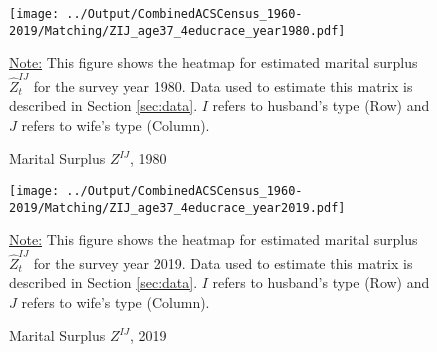 \begin{figure}[H] \caption{Marital Surplus $Z^{IJ}$, 1980} \label{appfig:Z1980}
    \texttt{[image: ../Output/CombinedACSCensus\_1960-2019/Matching/ZIJ\_age37\_4educrace\_year1980.pdf]}  
    \begin{fignote} 
\underline{Note:} This figure shows the heatmap for estimated marital surplus $\hat{Z}^{IJ}_t$ for the survey year 1980. Data used to estimate this matrix is described in Section \ref{sec:data}. $I$ refers to husband's type (Row) and $J$ refers to wife's type (Column). 
\end{fignote}  
\end{figure}



\begin{figure}[H] \caption{Marital Surplus $Z^{IJ}$, 2019}  \label{appfig:Z2019}
    \texttt{[image: ../Output/CombinedACSCensus\_1960-2019/Matching/ZIJ\_age37\_4educrace\_year2019.pdf]}    
      \begin{fignote} 
\underline{Note:} This figure shows the heatmap for estimated marital surplus $\hat{Z}^{IJ}_t$ for the survey year 2019. Data used to estimate this matrix is described in Section \ref{sec:data}. $I$ refers to husband's type (Row) and $J$ refers to wife's type (Column). 
\end{fignote} 
\end{figure}


\pagebreak


